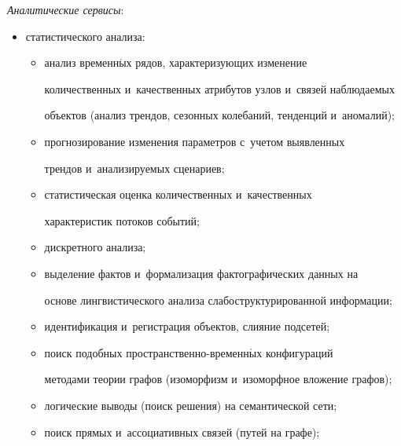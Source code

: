     \textit{Аналитические сервисы}:

     \begin{itemize}

   \item статистического анализа:

   \begin{itemize}

\item анализ временн$\acute{\mbox{ы}}$х рядов, характеризующих изменение 

количественных и~качественных атрибутов узлов и~связей наблюдаемых 

объектов (анализ трендов, сезонных колебаний, тенденций и~аномалий);\\[-13.5pt]

\item прогнозирование изменения параметров с~учетом выявленных 

трендов и~анализируемых сценариев;\\[-13.5pt]

\item статистическая оценка количественных и~качественных 

характеристик потоков событий;\\[-13.5pt]

\item дискретного анализа;\\[-13.5pt]

\item выделение фактов и~формализация фактографических данных на 

основе лингвистического анализа слабоструктурированной информации;\\[-13.5pt]

\item идентификация и~регистрация объектов, слияние подсетей;\\[-13.5pt]

\item поиск подобных пространственно-временн$\acute{\mbox{ы}}$х конфигураций 

методами тео\-рии графов (изоморфизм и~изоморфное вложение графов);\\[-13.5pt]

\item логические выводы (поиск решения) на семантической сети;\\[-13.5pt]

\item поиск прямых и~ассоциативных связей (путей на графе);\\[-13.5pt]


\end{itemize}
\end{itemize}
